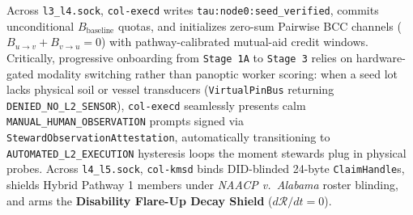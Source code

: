 Across \texttt{l3\_l4.sock}, \texttt{col-execd} writes \texttt{tau:node0:seed\_verified}, commits
unconditional $B_{\mathrm{baseline}}$ quotas, and initializes zero-sum Pairwise BCC channels
($B_{u\to v} + B_{v\to u} = 0$) with pathway-calibrated mutual-aid credit windows. Critically,
progressive onboarding from \texttt{Stage 1A} to \texttt{Stage 3} relies on hardware-gated modality
switching rather than panoptic worker scoring: when a seed lot lacks physical soil or vessel
transducers (\texttt{VirtualPinBus} returning \texttt{DENIED\_NO\_L2\_SENSOR}), \texttt{col-execd}
seamlessly presents calm \texttt{MANUAL\_HUMAN\_OBSERVATION} prompts signed via
\texttt{StewardObservationAttestation}, automatically transitioning to
\texttt{AUTOMATED\_L2\_EXECUTION} hysteresis loops the moment stewards plug in physical probes.
Across \texttt{l4\_l5.sock}, \texttt{col-kmsd} binds DID-blinded 24-byte \texttt{ClaimHandle}s,
shields Hybrid Pathway 1 members under \textit{NAACP v.\ Alabama} roster blinding, and arms the
\textbf{Disability Flare-Up Decay Shield} ($d\mathcal{R}/dt = 0$).

